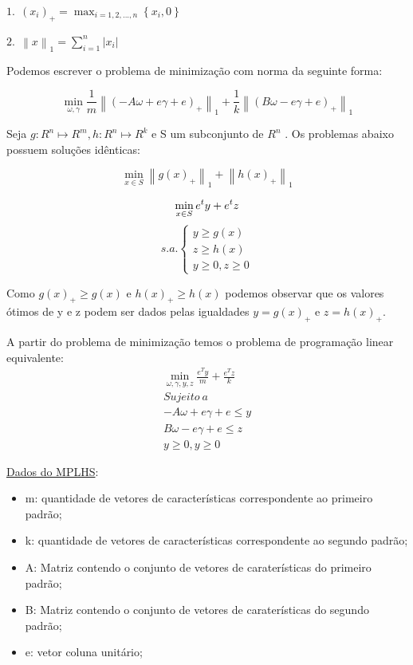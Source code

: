 $1.\ \ (x_{i})_{+} = \max_{i=1,2,...,n}{\left \{x_{i},0  \right \}}$

$2.\ \ \left \| x \right \|_{1} = \sum_{i=1}^{n}\left | x_{i} \right |$

Podemos escrever o problema de minimização com norma da seguinte forma:

$$\min_{\omega ,\gamma }\frac{1}{m}\left \| \left ( -A\omega + e\gamma  + e \right )_{+} \right \|_{1} + \frac{1}{k}\left \| \left ( B\omega - e\gamma + e  \right )_{+} \right \|_{1}$$

Seja $g:R^{n} \mapsto R^{m} , h:R^{n} \mapsto R^{k}$ e S um subconjunto de $R^{n}$ . Os problemas abaixo possuem soluções idênticas:

$$\min_{x\in S}\left \| g(x)_{+} \right \|_{1} + \left \| h(x)_{+} \right \|_{1}$$


$$\min_{x\in S} e^{t}y + e^{t}z\\$$
$$ s.a.\left\{\begin{matrix}y\geq g(x)\\ z\geq h(x)\\ y\geq 0, z\geq0\end{matrix}\right.$$

Como $g(x)_{+}\geq g(x)$ e $h(x)_{+}\geq h(x)$ podemos observar que os valores ótimos de y e z podem ser dados pelas igualdades $y=g(x)_{+}$ e $z=h(x)_{+}$.

A partir do problema de minimização temos o problema de programação linear equivalente:
\begin{eqnarray}
\min_{\omega ,\gamma ,y,z}\frac{e^{T}y}{m}+\frac{e^{T}z}{k} \label{eq3:obj1}\\
Sujeito\ a \nonumber\\
-A\omega +e\gamma+e\leq y\label{eq3:rest1}\\
B\omega -e\gamma+e\leq  z \label{eq3:rest2}\\ 
y\geq 0,y\geq 0 \label{eq3:rest3}
\end{eqnarray}

\underline{Dados do MPLHS}:
\begin{itemize}
\item{m}: quantidade de vetores de características correspondente ao primeiro padrão;
\item{k}: quantidade de vetores de características correspondente ao segundo padrão;
\item{A}: Matriz contendo o conjunto de vetores de caraterísticas do primeiro padrão;
\item{B}: Matriz contendo o conjunto de vetores de caraterísticas do segundo padrão;
\item{e}: vetor coluna unitário;
\end{itemize}

